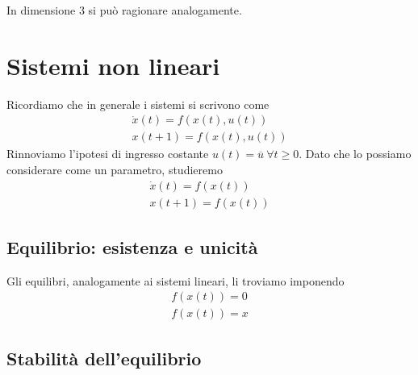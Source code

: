 \documentclass[10pt,a4paper]{book}
\begin{document}
\begin{itemize}
\begin{figure}[htpb]
\end{figure}\FloatBarrier

\end{itemize}

In dimensione $3$ si può ragionare analogamente.
\chapter{Sistemi non lineari}

Ricordiamo che in generale i sistemi si scrivono come
\begin{gather*}
\dot{x}( t) =f( x( t) ,u( t))\\
x( t+1) =f( x( t) ,u( t))
\end{gather*}
Rinnoviamo l'ipotesi di ingresso costante $u( t) =\overline{u} \ \forall t\geqslant 0$. Dato che lo possiamo considerare come un parametro, studieremo
\begin{gather*}
\dot{x}( t) =f( x( t))\\
x( t+1) =f( x( t))
\end{gather*}
\section{Equilibrio: esistenza e unicità}

Gli equilibri, analogamente ai sistemi lineari, li troviamo imponendo
\begin{gather*}
f( x( t)) =0\\
f( x( t)) =x
\end{gather*}
\section{Stabilità dell'equilibrio}
\end{document}
